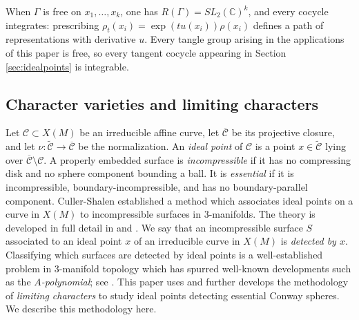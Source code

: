 \documentclass{article}
\theoremstyle{plain}
\theoremstyle{definition}
\theoremstyle{plain}
\theoremstyle{plain}
\theoremstyle{plain}
\theoremstyle{remark}
\theoremstyle{remark}
\theoremstyle{plain}
\theoremstyle{plain}
\theoremstyle{plain}
\theoremstyle{plain}
\begin{document}
\medskip

When $\Gamma$ is free on $x_1, \dots, x_k$, one has $R(\Gamma) = SL_2(\mathbb{C})^k$, and every cocycle integrates: prescribing $\rho_t(x_i) = \exp(tu(x_i))\rho(x_i)$ defines a path of representations with derivative $u$. Every tangle group arising in the applications of this paper is free, so every tangent cocycle appearing in Section \ref{sec:idealpoints} is integrable.

\subsection{Character varieties and limiting characters}

Let $\mathcal C \subset X(M)$ be an irreducible affine curve, let $\overline{\mathcal{C}}$ be its projective closure, and let $\nu: \widetilde{\mathcal C} \to \overline{\mathcal C}$ be the normalization. An \emph{ideal point} of $\mathcal C$ is a point $x \in \widetilde{\mathcal C}$ lying over $\overline{\mathcal C} \setminus \mathcal C$. A properly embedded surface is \emph{incompressible} if it has no compressing disk and no sphere component bounding a ball. It is \emph{essential} if it is incompressible, boundary-incompressible, and has no boundary-parallel component. Culler-Shalen \cite{cullershalen} established a method which associates ideal points on a curve in $X(M)$ to incompressible surfaces in 3-manifolds. The theory is developed in full detail in \cite{cullershalen} and \cite{shalen}. We say that an incompressible surface $S$ associated to an ideal point $x$ of an irreducible curve in $X(M)$ is \emph{detected by $x$}. Classifying which surfaces are detected by ideal points is a well-established problem in 3-manifold topology which has spurred well-known developments such as the \emph{$A$-polynomial}; see \cite{ccgls, chesebrotillmann, ohtsuki}. This paper uses and further develops the methodology of \emph{limiting characters} to study ideal points detecting essential Conway spheres. We describe this methodology here.
\end{document}
